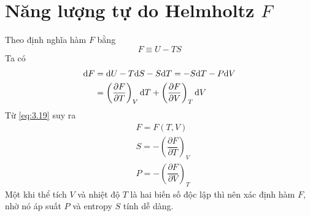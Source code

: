 \section{Năng lượng tự do Helmholtz $ F $}
	Theo định nghĩa hàm $ F $ bằng
	\begin{equation}\label{eq:3.18}
		F \equiv U - TS
	\end{equation}
	Ta có
	\begin{align}\label{eq:3.19}
		\mathrm{d}F
		& = \mathrm{d}U - T\mathrm{d}S - S\mathrm{d}T 
		= -S\mathrm{d}T - P\mathrm{d}V \\
		& = \left(\dfrac{\partial F}{\partial T}\right)_{V} \mathrm{d}T + \left(\dfrac{\partial F}{\partial V}\right)_{T} \mathrm{d}V \notag
	\end{align}
	Từ \eqref{eq:3.19} suy ra
	\begin{align}\label{eq:3.20}
		& F = F\left(T,V\right) \\
		& S = -\left(\dfrac{\partial F}{\partial T}\right)_{V} \\
		& P = -\left(\dfrac{\partial F}{\partial V}\right)_{T}
	\end{align}
	Một khi thể tích $ V $ và nhiệt độ $ T $ là hai biến số độc lập thì nên xác định hàm $ F $, nhờ nó áp suất $ P $ và entropy $ S $ tính dễ dàng.